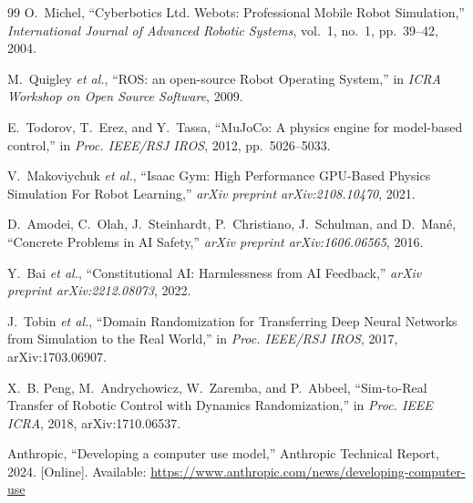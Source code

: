\documentclass{article}
\begin{document}
\begin{thebibliography}{99}
O.~Michel, ``Cyberbotics Ltd. Webots\texttrademark: Professional Mobile
Robot Simulation,'' \textit{International Journal of Advanced Robotic
Systems}, vol.~1, no.~1, pp.~39--42, 2004.

M.~Quigley \textit{et al.}, ``ROS: an open-source Robot Operating
System,'' in \textit{ICRA Workshop on Open Source Software}, 2009.

E.~Todorov, T.~Erez, and Y.~Tassa, ``MuJoCo: A physics engine for
model-based control,'' in \textit{Proc. IEEE/RSJ IROS}, 2012, pp.~5026--5033.

V.~Makoviychuk \textit{et al.}, ``Isaac Gym: High Performance GPU-Based
Physics Simulation For Robot Learning,'' \textit{arXiv preprint
arXiv:2108.10470}, 2021.

D.~Amodei, C.~Olah, J.~Steinhardt, P.~Christiano, J.~Schulman, and
D.~Man{\'e}, ``Concrete Problems in AI Safety,'' \textit{arXiv preprint
arXiv:1606.06565}, 2016.

Y.~Bai \textit{et al.}, ``Constitutional AI: Harmlessness from AI
Feedback,'' \textit{arXiv preprint arXiv:2212.08073}, 2022.

J.~Tobin \textit{et al.}, ``Domain Randomization for Transferring Deep
Neural Networks from Simulation to the Real World,'' in \textit{Proc.
IEEE/RSJ IROS}, 2017, arXiv:1703.06907.

X.~B. Peng, M.~Andrychowicz, W.~Zaremba, and P.~Abbeel, ``Sim-to-Real
Transfer of Robotic Control with Dynamics Randomization,'' in \textit{Proc.
IEEE ICRA}, 2018, arXiv:1710.06537.

Anthropic, ``Developing a computer use model,'' Anthropic Technical
Report, 2024. [Online]. Available: \url{https://www.anthropic.com/news/developing-computer-use}

\end{thebibliography}
\end{document}
